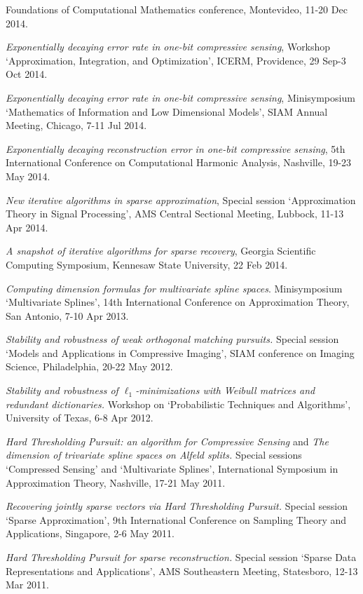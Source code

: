\documentclass[11pt]{article}
\begin{document}
Foundations of Computational Mathematics conference, Montevideo, 11-20 Dec 2014.
\item {\sl Exponentially decaying error rate in one-bit compressive sensing}, Workshop `Approximation, Integration, and Optimization',
ICERM, Providence, 29 Sep-3 Oct 2014. 
\item {\sl Exponentially decaying error rate in one-bit compressive sensing}, Minisymposium `Mathematics of Information and Low Dimensional Models',
SIAM Annual Meeting, Chicago, 7-11 Jul 2014.
\item {\sl Exponentially decaying reconstruction error in one-bit compressive sensing},  
5th International Conference on Computational Harmonic Analysis, Nashville, 19-23 May 2014.
\item {\sl New iterative algorithms in sparse approximation}, Special session `Approximation Theory in Signal Processing', AMS Central Sectional Meeting, Lubbock, 11-13 Apr 2014.
\item {\sl A snapshot of iterative algorithms for sparse recovery}, Georgia Scientific Computing Symposium, Kennesaw State University, 22 Feb 2014.
\item {\sl Computing dimension formulas for multivariate spline spaces}.
Minisymposium `Multivariate Splines',
14th International Conference on Approximation Theory, San Antonio, 7-10 Apr 2013.
\item  {\sl Stability and robustness of weak orthogonal matching pursuits.}
Special session `Models and \mbox{Applications} in Compressive Imaging', SIAM conference on Imaging Science, Philadelphia, 20-22 May 2012.
\item {\sl Stability and robustness of $\ell_1$-minimizations with Weibull matrices and redundant dictionaries.}
Workshop on `Probabilistic Techniques and Algorithms', University of Texas, 6-8 Apr 2012.
\item {\sl Hard Thresholding Pursuit: an algorithm for Compressive Sensing} and {\sl The dimension of trivariate spline spaces on Alfeld splits.}
Special sessions `Compressed Sensing' and `Multivariate Splines', International Symposium in Approximation Theory, Nashville, 17-21 May 2011.
\item {\sl Recovering jointly sparse vectors via Hard Thresholding Pursuit.} 
Special session `Sparse Approximation', 9th International Conference on Sampling Theory and Applications, Singapore, 2-6 May 2011.
\item {\sl Hard Thresholding Pursuit for sparse reconstruction.}
Special session `Sparse Data Representations and Applications',  AMS  Southeastern Meeting, Statesboro, 12-13 Mar 2011.
\end{document}
